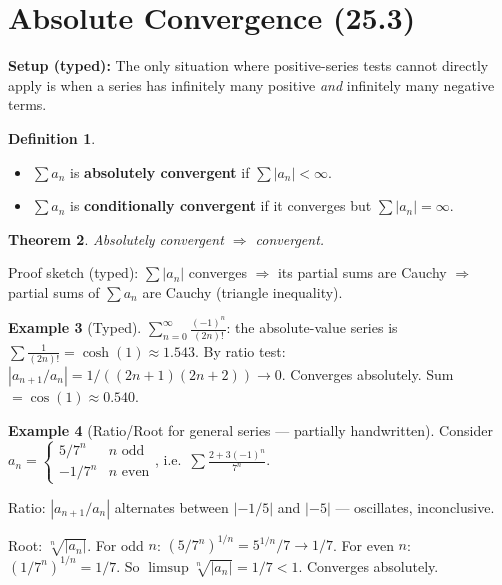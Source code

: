 \documentclass[12pt, a4paper]{article}
\newtheorem{theorem}{Theorem}[section]
\theoremstyle{definition}
\newtheorem{definition}[theorem]{Definition}
\newtheorem{example}[theorem]{Example}
\theoremstyle{remark}
\begin{document}
\section{Absolute Convergence (25.3)}

\textbf{Setup (typed):} The only situation where positive-series tests cannot directly apply is when a series has infinitely many positive \emph{and} infinitely many negative terms.

\begin{definition}
\begin{itemize}
  \item $\sum a_n$ is \textbf{absolutely convergent} if $\sum |a_n| < \infty$.
  \item $\sum a_n$ is \textbf{conditionally convergent} if it converges but $\sum |a_n| = \infty$.
\end{itemize}
\end{definition}

\begin{theorem}
Absolutely convergent $\Rightarrow$ convergent.
\end{theorem}

Proof sketch (typed): $\sum |a_n|$ converges $\Rightarrow$ its partial sums are Cauchy $\Rightarrow$ partial sums of $\sum a_n$ are Cauchy (triangle inequality).

\begin{example}[Typed]
$\displaystyle\sum_{n=0}^\infty \frac{(-1)^n}{(2n)!}$: the absolute-value series is $\sum \frac{1}{(2n)!} = \cosh(1) \approx 1.543$.
By ratio test: $|a_{n+1}/a_n| = 1/((2n+1)(2n+2)) \to 0$. Converges absolutely.
Sum $= \cos(1) \approx 0.540$.
\end{example}

\begin{example}[Ratio/Root for general series --- partially handwritten]
Consider $a_n = \begin{cases} 5/7^n & n \text{ odd} \\ -1/7^n & n \text{ even} \end{cases}$, i.e.\ $\sum \frac{2+3(-1)^n}{7^n}$.

Ratio: $|a_{n+1}/a_n|$ alternates between $|-1/5|$ and $|-5|$ --- oscillates, inconclusive.

Root: $\sqrt[n]{|a_n|}$. For odd $n$: $(5/7^n)^{1/n} = 5^{1/n}/7 \to 1/7$.
For even $n$: $(1/7^n)^{1/n} = 1/7$.
So $\limsup \sqrt[n]{|a_n|} = 1/7 < 1$. Converges absolutely.
\end{example}
\end{document}
